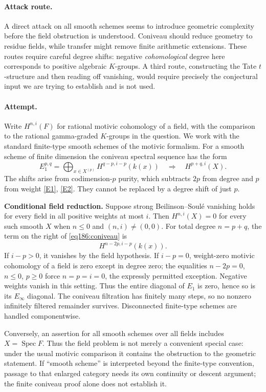 \documentclass[11pt,a4paper]{article}
\newcommand{\eref}[2]{\hyperlink{extra:#1:#2}{[E#2]}}
\numberwithin{equation}{section}
\begin{document}
\paragraph{Attack route.}
A direct attack on all smooth schemes seems to introduce geometric complexity before the field obstruction is understood. Coniveau should reduce geometry to residue fields, while transfer might remove finite arithmetic extensions. These routes require careful degree shifts: negative \emph{cohomological} degree here corresponds to positive algebraic $K$-groups. A third route, constructing the Tate $t$-structure and then reading off vanishing, would require precisely the conjectural input we are trying to establish and is not used.

\paragraph{Attempt.}
Write $H^{n,i}(F)$ for rational motivic cohomology of a field, with the comparison to the rational gamma-graded $K$-groups in the question. We work with the standard finite-type smooth schemes of the motivic formalism. For a smooth scheme of finite dimension the coniveau spectral sequence has the form
\begin{equation}\label{eq186:coniveau}
 E_1^{p,q}=\bigoplus_{x\in X^{(p)}}H^{q-p,i-p}(k(x))
 \quad\Longrightarrow\quad H^{p+q,i}(X).
\end{equation}
The shifts arise from codimension-$p$ purity, which subtracts $2p$ from degree and $p$ from weight \eref{30006779}{1}, \eref{30006779}{2}. They cannot be replaced by a degree shift of just $p$.

\textbf{Conditional field reduction.} Suppose strong Beilinson--Soul\'e vanishing holds for every field in all positive weights at most $i$. Then $H^{n,i}(X)=0$ for every such smooth $X$ when $n\le0$ and $(n,i)\ne(0,0)$.
For total degree $n=p+q$, the term on the right of \eqref{eq186:coniveau} is
\[
 H^{n-2p,i-p}(k(x)).
\]
If $i-p>0$, it vanishes by the field hypothesis. If $i-p=0$, weight-zero motivic cohomology of a field is zero except in degree zero; the equalities $n-2p=0$, $n\le0$, $p\ge0$ force $n=p=i=0$, the expressly permitted exception. Negative weights vanish in this setting. Thus the entire diagonal of $E_1$ is zero, hence so is its $E_\infty$ diagonal. The coniveau filtration has finitely many steps, so no nonzero infinitely filtered remainder survives. Disconnected finite-type schemes are handled componentwise.

Conversely, an assertion for all smooth schemes over all fields includes $X=\operatorname{Spec}F$. Thus the field problem is not merely a convenient special case: under the usual motivic comparison it contains the obstruction to the geometric statement. If ``smooth scheme'' is interpreted beyond the finite-type convention, passage to that enlarged category needs its own continuity or descent argument; the finite coniveau proof alone does not establish it.
\end{document}
